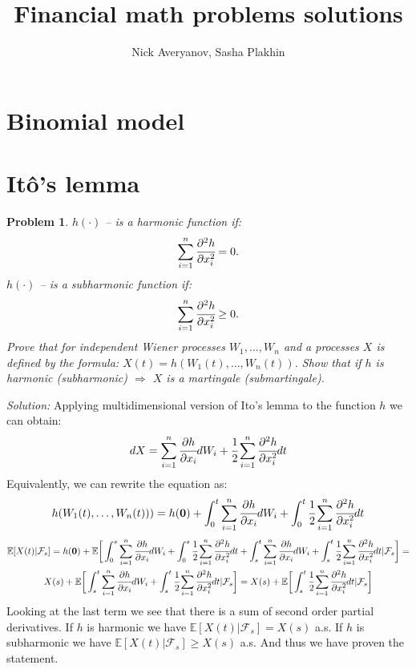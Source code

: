 \documentclass[a4paper, 12pt]{article}
\author{Nick Averyanov, Sasha Plakhin}
\title{Financial math problems solutions}
\theoremstyle{problemstyle}
\newtheorem{problem}{Problem}[section]
\newenvironment{solution}
{\textit{Solution:}}
{}
\newcommand{\E}{\mathbb{E}}
\begin{document}
\maketitle

\newpage
\tableofcontents{}

\newpage
\section{Binomial model}

\section{Itô's lemma}
\begin{problem}
$h(\cdot)$ -- is a harmonic function if:
$$
\sum_{i=1}^n \cfrac{\partial^2 h}{\partial x_i^2} = 0.
$$
$h(\cdot) $ -- is a subharmonic function if:
$$
\sum_{i=1}^n \cfrac{\partial^2 h}{\partial x_i^2} \geq 0.
$$
Prove that for independent  Wiener processes $W_1, \ldots, W_n$ and a processes $X$ is defined by the formula: $X(t) = h(W_1(t), \ldots, W_n(t))$. Show that if $h$ is harmonic (subharmonic) $\Rightarrow$  $X$ is a martingale (submartingale).
\end{problem}

\begin{solution}
	Applying multidimensional version of Ito's lemma to the function $h$ we can obtain:
	$$
	dX = \sum_{i=1}^n \cfrac{\partial h}{\partial x_i} dW_i + \cfrac{1}{2} \sum_{i=1}^n \cfrac{\partial^2 h}{\partial x_i^2} dt
	$$
	Equivalently, we can rewrite the equation as:
	$$
	h(W_1(t), \ldots, W_n(t)) ) = h(\boldsymbol{0}) + \int_0^t  \sum_{i=1}^n \cfrac{\partial h}{\partial x_i} dW_i + \int_0^t\cfrac{1}{2} \sum_{i=1}^n \cfrac{\partial^2 h}{\partial x_i^2} dt
	$$
	\begin{multline*}
		\E[X(t)| \mathcal{F}_s] = h(\boldsymbol{0})  + \E\bigg[ \int_0^s  \sum_{i=1}^n \cfrac{\partial h}{\partial x_i} dW_i + \int_0^s\cfrac{1}{2} \sum_{i=1}^n \cfrac{\partial^2 h}{\partial x_i^2} dt + \int_s^t  \sum_{i=1}^n \cfrac{\partial h}{\partial x_i} dW_i + \int_s^t\cfrac{1}{2} \sum_{i=1}^n \cfrac{\partial^2 h}{\partial x_i^2} dt | \mathcal{F}_s \bigg ] =  \\
		X(s) + \E \bigg[ \int_s^t  \sum_{i=1}^n \cfrac{\partial h}{\partial x_i} dW_i + \int_s^t\cfrac{1}{2} \sum_{i=1}^n \cfrac{\partial^2 h}{\partial x_i^2} dt | \mathcal{F}_s \bigg ] = X(s) + \E \bigg[ \int_s^t\cfrac{1}{2} \sum_{i=1}^n \cfrac{\partial^2 h}{\partial x_i^2} dt | \mathcal{F}_s \bigg ]
	\end{multline*}
	Looking at the last term we see that there is a sum of second order partial derivatives. If $h$ is harmonic we have $\E[X(t)|\mathcal{F}_s] = X(s)$ a.s. If  $h$ is subharmonic we have $\E[X(t)|\mathcal{F}_s] \geq X(s)$ a.s. And thus we have proven the statement.

\end{solution}
\end{document}
